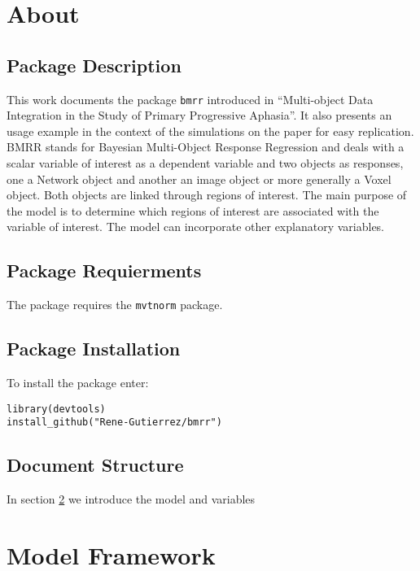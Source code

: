 \documentclass[
]{article}
\begin{document}
\section{About}\label{about}

\subsection{Package Description}\label{package-description}

This work documents the package \texttt{bmrr} introduced in ``Multi-object
Data Integration in the Study of Primary Progressive Aphasia''. It also presents
an usage example in the context of the simulations on the paper for easy
replication. BMRR stands for Bayesian Multi-Object Response Regression and deals
with a scalar variable of interest as a dependent variable and two objects as
responses, one a Network object and another an image object or more
generally a Voxel object. Both objects are linked through regions of interest.
The main purpose of the model is to determine which regions of interest are
associated with the variable of interest. The model can incorporate other
explanatory variables.

\subsection{Package Requierments}\label{package-requierments}

The package requires the \texttt{mvtnorm} \citep{mvtnorm, genz} package.

\subsection{Package Installation}\label{package-installation}

To install the package enter:

\begin{verbatim}
library(devtools)
install_github("Rene-Gutierrez/bmrr")
\end{verbatim}

\subsection{Document Structure}\label{document-structure}

In section \ref{modelFramework} we introduce the model and variables

\section{Model Framework}\label{modelFramework}
\end{document}
